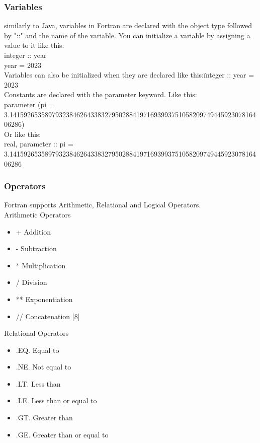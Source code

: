 \documentclass[11pt,a4paper]{scrartcl}
\begin{document}
\begin{center}
\subsubsection{Variables}
similarly to Java, variables in Fortran are declared with the object type followed by "::" and the name of the variable.
You can initialize a variable by assigning a value to it like this:\\
integer :: year\\
year = 2023\\
Variables can also be initialized when they are declared like this:\"integer :: year = 2023\"\\
Constants are declared with the parameter keyword. Like this:\\
parameter (pi = 3.141592653589793238462643383279502884197169399375105820974944592307816406286)\\%
Or like this:\\
real, parameter :: pi = 3.141592653589793238462643383279502884197169399375105820974944592307816406286\\

\subsubsection{Operators}
Fortran supports Arithmetic, Relational and Logical Operators.\\

Arithmetic Operators
\begin{itemize}
\item + Addition
\item - Subtraction
\item * Multiplication
\item / Division
\item ** Exponentiation
\item // Concatenation [8]
\end{itemize}

Relational Operators
\begin{itemize}
\item .EQ. Equal to
\item .NE. Not equal to
\item .LT. Less than
\item .LE. Less than or equal to
\item .GT. Greater than
\item .GE. Greater than or equal to
\end{itemize}


\end{center}
\end{document}
